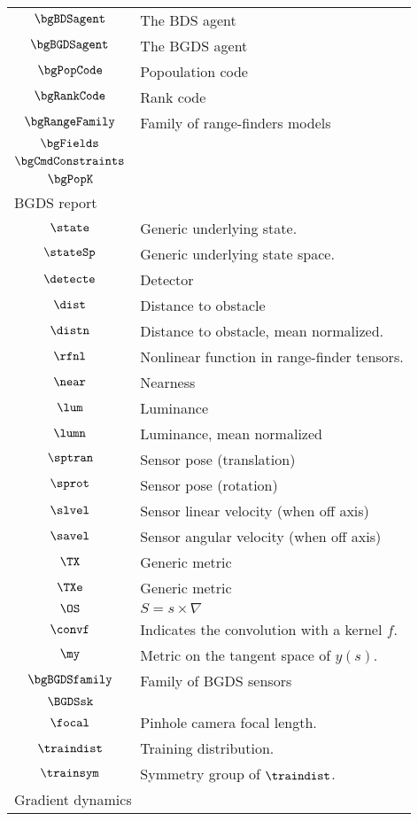 \begin{longtable}{cl}
 $\bgBDSagent$ &  The BDS agent\\ 
 $\bgBGDSagent$ &  The BGDS agent\\ 
 $\bgPopCode$ &  Popoulation code\\ 
 $\bgRankCode$ &  Rank code\\ 
 $\bgRangeFamily$ &  Family of range-finders models\\ 
 $\bgFields$ & \\ 
 $\bgCmdConstraints$ & \\ 
 $\bgPopK$ & \\ 
 \multicolumn{2}{l}{BGDS report}\\ 
 \hline
$\state$ &  Generic underlying state.\\ 
 $\stateSp$ &  Generic underlying state space.\\ 
 $\detecte$ &  Detector\\ 
 $\dist$ &  Distance to obstacle\\ 
 $\distn$ &  Distance to obstacle, mean normalized.\\ 
 $\rfnl$ &  Nonlinear function in range-finder tensors.\\ 
 $\near$ &  Nearness\\ 
 $\lum$ &  Luminance\\ 
 $\lumn$ &  Luminance, mean normalized\\ 
 $\sptran$ &  Sensor pose (translation)\\ 
 $\sprot$ &  Sensor pose (rotation)\\ 
 $\slvel$ &  Sensor linear velocity (when off axis)\\ 
 $\savel$ &  Sensor angular velocity (when off axis)\\ 
 $\TX$ &  Generic metric\\ 
 $\TXe$ &  Generic metric\\ 
 $\OS$ &  $S = s\times \nabla$\\ 
 $\convf$ &  Indicates the convolution with a kernel $f$.\\ 
 $\my$ &  Metric on the tangent space of $y(s)$.\\ 
 $\bgBGDSfamily$ &  Family of BGDS sensors\\ 
 $\BGDSsk$ & \\ 
 $\focal$ &  Pinhole camera focal length.\\ 
 $\traindist$ &  Training distribution.\\ 
 $\trainsym$ &  Symmetry group of $\traindist$.\\ 
 \multicolumn{2}{l}{Gradient dynamics}\\ 

\end{longtable}
